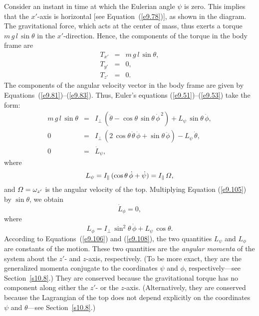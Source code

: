 Consider an instant in time at which the Eulerian angle $\psi$ is zero.
This implies that the $x'$-axis is horizontal [see Equation~(\ref{e9.78})], as shown in the diagram.
The gravitational force, which acts at the
center of mass, thus exerts a torque $m\,g\,l\,\sin\theta$ in the
$x'$-direction. Hence, the components of the torque in the body
frame are
\begin{eqnarray}
T_{x'} &=& m\,g\,l\,\sin\theta,\\[0.5ex]
T_{y'} &=& 0,\\[0.5ex]
T_{z'} &=& 0.
\end{eqnarray}
The components of the angular velocity vector in the body frame
are given by Equations~(\ref{e9.81})--(\ref{e9.83}). 
 Thus, Euler's equations
(\ref{e9.51})--(\ref{e9.53}) take the form:
\begin{eqnarray}
m\,g\,l\,\sin\theta &=& I_\perp\,(\ddot{\theta}- \cos\theta\,\sin\theta\,\dot{\phi}^{\,2}) + L_\psi\,\sin\theta\,\dot{\phi},\label{e9.104}\\[0.5ex]
0&=& I_\perp\,(2\,\cos\theta\,\dot{\theta}\,\dot{\phi} +\sin\theta\,\ddot{\phi}) - L_\psi\,\dot{\theta},\label{e9.105}\\[0.5ex]
0&=& \dot{L}_\psi,\label{e9.106}
\end{eqnarray}
where
\begin{equation}
L_\psi = I_\parallel\,(\cos\theta\,\dot{\phi}+\dot{\psi})= I_\parallel\,{\mit\Omega},
\end{equation}
and ${\mit\Omega} = \omega_{z'}$ is the angular velocity of the top.
Multiplying Equation (\ref{e9.105}) by $\sin\theta$, we obtain
\begin{equation}\label{e9.108}
\dot{L}_\phi = 0,
\end{equation}
where
\begin{equation}\label{e9.109}
L_\phi = I_\perp\,\sin^2\theta\,\dot{\phi} + L_\psi\,\cos\theta.
\end{equation}
According to Equations~(\ref{e9.106}) and (\ref{e9.108}), the
two quantities $L_\psi$ and $L_\phi$ are constants
of the motion. These two quantities are the {\em angular momenta}\/ of the
system about the $z'$- and $z$-axis, respectively. (To be more exact,
they are the generalized momenta conjugate to the coordinates $\psi$ and
$\phi$, respectively---see Section~\ref{s10.8}.) They
are conserved because the gravitational torque has no component
along either the $z'$-  or the $z$-axis. (Alternatively, they are
conserved because the Lagrangian of the top does not depend explicitly
on the coordinates $\psi$ and $\theta$---see Section~\ref{s10.8}.)

